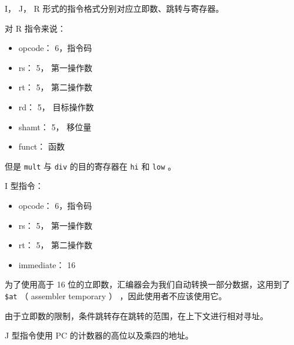 \documentclass[cn,11pt,chinese,black,simple]{../elegantbook}
\begin{document}
I， J， R 形式的指令格式分别对应立即数、跳转与寄存器。

对 R 指令来说：

\begin{itemize}
    \item opcode： 6，指令码
    \item rs： 5， 第一操作数 
    \item rt： 5， 第二操作数
    \item rd： 5， 目标操作数
    \item shamt： 5， 移位量
    \item funct： 函数
\end{itemize}

但是 \lstinline{mult} 与 \lstinline{div} 的目的寄存器在 \lstinline{hi} 和 \lstinline{low} 。

I 型指令：


\begin{itemize}
    \item opcode： 6，指令码
    \item rs： 5， 第一操作数 
    \item rt： 5， 第二操作数
    \item immediate： 16
\end{itemize}

为了使用高于 16 位的立即数，汇编器会为我们自动转换一部分数据，这用到了 \lstinline{$at} （ assembler temporary ） ，因此使用者不应该使用它。

由于立即数的限制，条件跳转存在跳转的范围，在上下文进行相对寻址。


J 型指令使用 PC 的计数器的高位以及乘四的地址。

\let\chapname\undefined
\ifx\mainclass\undefined
\end{document}
